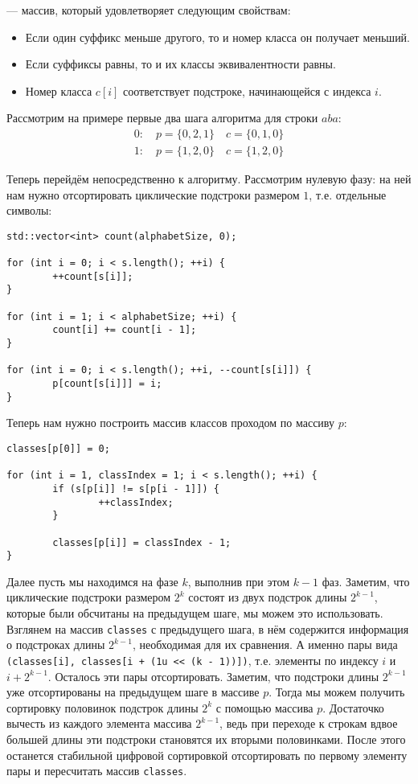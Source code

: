 \begin{definition}
         --- массив, который удовлетворяет следующим свойствам:
        \begin{itemize}
                \item Если один суффикс меньше другого, то и номер класса он получает меньший.
                \item Если суффиксы равны, то и их классы эквивалентности равны.
                \item Номер класса $c[i]$ соответствует подстроке, начинающейся с индекса $i$.
        \end{itemize}
\end{definition}

Рассмотрим на примере первые два шага алгоритма для строки $aba$:
\begin{gather*}
        0: \quad p = \{ 0, 2, 1 \} \quad c = \{ 0, 1, 0 \} \\
        1: \quad p = \{ 1, 2, 0 \} \quad c = \{ 1, 2, 0 \}
\end{gather*}

Теперь перейдём непосредственно к алгоритму. 
Рассмотрим нулевую фазу: на ней нам нужно отсортировать циклические подстроки размером $1$, т.е. отдельные
символы:
\begin{lstlisting}
std::vector<int> count(alphabetSize, 0);

for (int i = 0; i < s.length(); ++i) {
        ++count[s[i]];
}

for (int i = 1; i < alphabetSize; ++i) {
        count[i] += count[i - 1];
}

for (int i = 0; i < s.length(); ++i, --count[s[i]]) {
        p[count[s[i]]] = i;
}
\end{lstlisting}

Теперь нам нужно построить массив классов проходом по массиву $p$:
\begin{lstlisting}
classes[p[0]] = 0;

for (int i = 1, classIndex = 1; i < s.length(); ++i) {
        if (s[p[i]] != s[p[i - 1]]) {
                ++classIndex;
        }
        
        classes[p[i]] = classIndex - 1;
}
\end{lstlisting}
Далее пусть мы находимся на фазе $k$, выполнив при этом  $k-1$ фаз.
Заметим, что циклические подстроки размером  $2^{k}$ состоят из двух подстрок длины $2^{k - 1}$, которые
были обсчитаны на предыдущем шаге, мы можем это использовать. Взглянем на массив \texttt{classes} с
предыдущего шага, в нём содержится информация о подстроках длины $2^{k - 1}$, необходимая для их сравнения.
А именно пары вида \texttt{(classes[i], classes[i + (1u << (k - 1))])}, 
т.е. элементы по индексу $i$ и $i + 2^{k-1}$. Осталось эти пары отсортировать. Заметим, что
подстроки длины $2^{k - 1}$ уже отсортированы на предыдущем шаге в массиве $p$.
Тогда мы можем получить сортировку половинок подстрок длины $2^{k}$ с помощью массива $p$.
Достаточко вычесть из каждого элемента массива $2^{k-1}$, ведь при переходе к строкам вдвое большей длины
эти подстроки становятся их вторыми половинками. После этого останется стабильной цифровой сортировкой
отсортировать по первому элементу пары и пересчитать массив \texttt{classes}.

